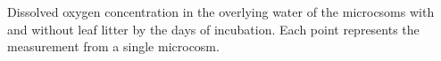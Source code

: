 \label{fig:DO_days}

Dissolved oxygen concentration in the overlying water of the microcsoms with and without leaf litter by the days of incubation. Each point represents the measurement from a single microcosm.